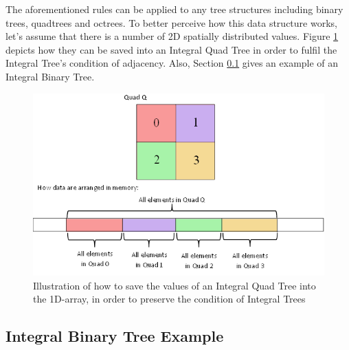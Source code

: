 \documentclass{subfiles}
\begin{document}
\par The aforementioned rules can be applied to any tree structures including binary trees, quadtrees and octrees. To better perceive how this data structure works, let’s assume that there is a number of 2D spatially distributed values. Figure  \ref{fig:IntegralTreeQuads} depicts how they can be saved into an Integral Quad Tree in order to fulfil the Integral Tree's condition of adjacency. Also, Section {\ref{sec:IntegralBinaryTree}} gives an example of an Integral Binary Tree.

\begin{figure}[!htbp]
	\centering
	\includegraphics[width=5.4in]{img/IntegralTree}
	\caption{Illustration of how to save the values of an Integral Quad Tree into the 1D-array, in order to preserve the condition of Integral Trees}
	\label{fig:IntegralTreeQuads}
\end{figure}


\subsection{Integral Binary Tree Example}\label{sec:IntegralBinaryTree}
\end{document}
